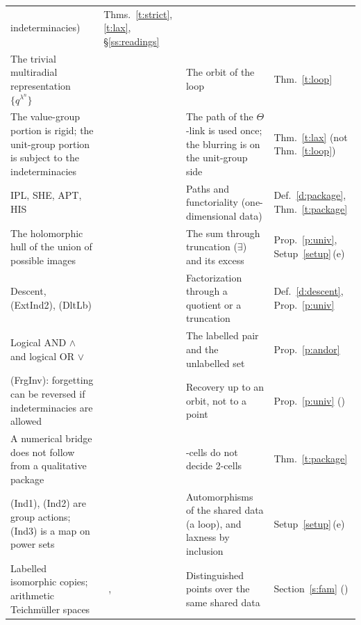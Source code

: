 \documentclass[11pt,a4paper]{article}
\newcommand{\lab}[2]{{\upshape\fcolorbox{#1}{#1!8}{\scriptsize\sffamily\bfseries\textcolor{#1}{#2}}}}
\newcommand{\tagS}{\lab{blue}{S}}
\newcommand{\tagX}{\lab{Plum}{X}}
\newcommand{\tagH}{\lab{BurntOrange}{H}}
\theoremstyle{plain}
\theoremstyle{definition}
\theoremstyle{remark}
\begin{document}
{\begin{longtable}{@{}>{\raggedright\arraybackslash}p{4.2cm}>{\raggedright\arraybackslash}p{3.1cm}>{\raggedright\arraybackslash}p{4.3cm}>{\raggedright\arraybackslash}p{2.5cm}@{}}
indeterminacies) & Thms.~\ref{t:strict}, \ref{t:lax}, \S\ref{ss:readings}\\
The trivial multiradial representation $\{q^{\lambda^n}\}$ & \tagS\ \cite[Rem.~3.11.1\,(vii)]{IUT3} & The orbit of
the loop & Thm.~\ref{t:loop}\\
The value-group portion is rigid; the unit-group portion is subject to the indeterminacies & \tagS\
\cite[Rem.~3.11.1\,(viii), Step~(xi-b)]{IUT3} & The path of the $\Theta$-link is used once; the blurring is on the
unit-group side & Thm.~\ref{t:lax} (not Thm.~\ref{t:loop})\\
IPL, SHE, APT, HIS & \tagS\ \cite[Rem.~3.11.1\,(iii),\,(iv)]{IUT3} & Paths and functoriality (one-dimensional data) &
Def.~\ref{d:package}, Thm.~\ref{t:package}\\
The holomorphic hull of the union of possible images & \tagS\ \cite[Cor.~3.12]{IUT3} & The sum through truncation
($\exists$) and its excess & Prop.~\ref{p:univ}, Setup~\ref{setup}\,(e)\\
Descent, (ExtInd2), (DltLb) & \tagS\ \cite[\S3.9, \S3.6, \S3.11]{Ess} & Factorization through a quotient or a
truncation & Def.~\ref{d:descent}, Prop.~\ref{p:univ}\\
Logical AND $\wedge$ and logical OR $\vee$ & \tagS\ \cite[Ex.~2.4.8\,(iv-c)]{Ess} & The labelled pair and the unlabelled
set & Prop.~\ref{p:andor}\\
(FrgInv): forgetting can be reversed if indeterminacies are allowed & \tagS\ \cite[\S3.11]{Ess} & Recovery up to an
orbit, not to a point & Prop.~\ref{p:univ} (\tagH)\\
A numerical bridge does not follow from a qualitative package & \tagX\ \cite{Hi} & 1-cells do not decide 2-cells &
Thm.~\ref{t:package}\\
(Ind1), (Ind2) are group actions; (Ind3) is a map on power sets & \tagX\ \cite[\S1, \S4.6]{DH1} & Automorphisms of the
shared data (a loop), and laxness by inclusion & Setup~\ref{setup}\,(e)\\
Labelled isomorphic copies; arithmetic Teichm\"uller spaces & \tagX\ \cite[\S1]{Jo1}, \cite[\S1]{Jo2} &
Distinguished points over the same shared data & Section~\ref{s:fam} (\tagH)\\
\bottomrule
\end{longtable}
}
\end{document}
